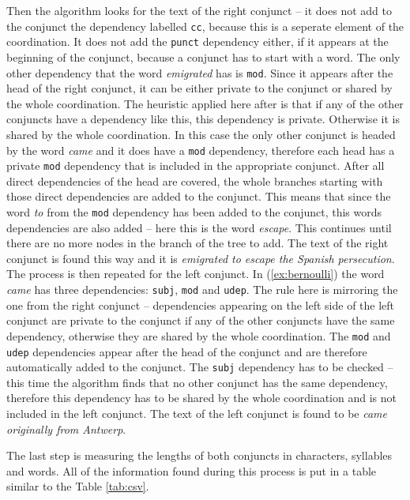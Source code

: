 Then the algorithm looks for the text of the right conjunct -- it does not add to the conjunct the dependency labelled \texttt{cc}, because this is a seperate element of the coordination. It does not add the \texttt{punct} dependency either, if it appears at the beginning of the conjunct, because a conjunct has to start with a word. The only other dependency that the word \textsl{emigrated} has is \texttt{mod}. Since it appears after the head of the right conjunct, it can be either private to the conjunct or shared by the whole coordination. The heuristic applied here after \cite{prz:etal:24} is that if any of the other conjuncts have a dependency like this, this dependency is private. Otherwise it is shared by the whole coordination. In this case the only other conjunct is headed by the word \textsl{came} and it does have a \texttt{mod} dependency, therefore each head has a private \texttt{mod} dependency that is included in the appropriate conjunct. After all direct dependencies of the head are covered, the whole branches starting with those direct dependencies are added to the conjunct. This means that since the word \textsl{to} from the \texttt{mod} dependency has been added to the conjunct, this words dependencies are also added -- here this is the word \textsl{escape}. This continues until there are no more nodes in the branch of the tree to add. The text of the right conjunct is found this way and it is \textsl{emigrated to escape the Spanish persecution}. The process is then repeated for the left conjunct. In (\ref{ex:bernoulli}) the word \textsl{came} has three dependencies: \texttt{subj}, \texttt{mod} and \texttt{udep}. The rule here is mirroring the one from the right conjunct -- dependencies appearing on the left side of the left conjunct are private to the conjunct if any of the other conjuncts have the same dependency, otherwise they are shared by the whole coordination. The \texttt{mod} and \texttt{udep} dependencies appear after the head of the conjunct and are therefore automatically added to the conjunct. The \texttt{subj} dependency has to be checked -- this time the algorithm finds that no other conjunct has the same dependency, therefore this dependency has to be shared by the whole coordination and is not included in the left conjunct. The text of the left conjunct is found to be \textsl{came originally from Antwerp}. 

The last step is measuring the lengths of both conjuncts in characters, syllables and words. All of the information found during this process is put in a table similar to the Table \ref{tab:csv}.

